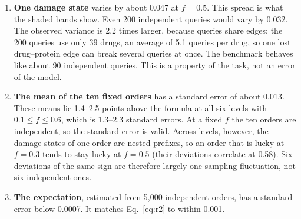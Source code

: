 \begin{enumerate}[leftmargin=*,itemsep=2pt]
\item \textbf{One damage state} varies by about 0.047 at $f=0.5$. This spread is
what the shaded bands show. Even 200 independent queries would vary by 0.032.
The observed variance is 2.2 times larger, because queries share edges: the
200 queries use only 39 drugs, an average of 5.1 queries per drug, so one lost
drug--protein edge can break several queries at once. The benchmark behaves
like about 90 independent queries. This is a property of the task, not an
error of the model.
\item \textbf{The mean of the ten fixed orders} has a standard error of about
0.013. These means lie 1.4--2.5 points above the formula at all six levels with
$0.1\le f\le0.6$, which is 1.3--2.3 standard errors. At a fixed $f$ the ten
orders are independent, so the standard error is valid. Across levels, however,
the damage states of one order are nested prefixes, so an order that is lucky
at $f=0.3$ tends to stay lucky at $f=0.5$ (their deviations correlate at 0.58).
Six deviations of the same sign are therefore largely one sampling
fluctuation, not six independent ones.
\item \textbf{The expectation}, estimated from 5,000 independent orders, has a
standard error below 0.0007. It matches Eq.~\eqref{eq:r2} to within 0.001.
\end{enumerate}

